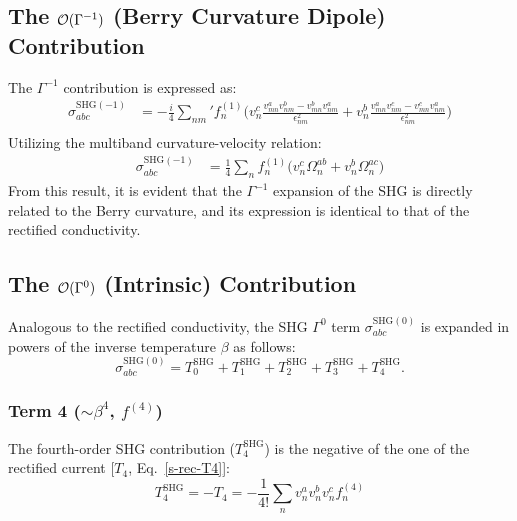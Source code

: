 \documentclass[twocolumn, prx, reprint, amsfonts, amsmath, amssymb, longbibliography, floatfix, aps]{revtex4-2}
\begin{document}
\subsection{The \texorpdfstring{${\cal O}(\Gamma^{-1})$}{O(Gamma-1)} (Berry Curvature Dipole) Contribution}
The $\Gamma^{-1}$ contribution is expressed as:
\begin{equation}
	\begin{aligned}
		\sigma^{\text{SHG}(-1)}_{abc} &= -\frac{i}{4} {\textstyle \sum_{nm}'} f^{(1)}_n \Big(v^c_{n}\frac{v^{a}_{mn}v^b_{nm} - v^{b}_{mn}v^a_{nm}}{\epsilon_{nm}^2} + v^b_{n}\frac{v^{a}_{mn}v^c_{nm} - v^{c}_{mn}v^a_{nm}}{\epsilon_{nm}^2} \Big) \\
	\end{aligned}
\end{equation}
Utilizing the multiband curvature-velocity relation:
\begin{equation}
	\begin{aligned}
		\sigma^{\text{SHG}(-1)}_{abc}
		&= \frac{1}{4} {\textstyle \sum_{n}} f^{(1)}_n \Big(v^c_{n}\Omega^{ab}_n + v^b_{n}\Omega^{ac}_n \Big)
	\end{aligned}
\end{equation}
From this result, it is evident that the $\Gamma^{-1}$ expansion of the SHG is directly related to the Berry curvature, and its expression is identical to that of the rectified conductivity.

\subsection{The \texorpdfstring{${\cal O}(\Gamma^{0})$}{O(Gamma-0)} (Intrinsic) Contribution}
Analogous to the rectified conductivity, the SHG $\Gamma^0$ term $\sigma_{abc}^{\text{SHG}(0)}$ is expanded in powers of the inverse temperature $\beta$ as follows:
\begin{equation}
	\sigma_{abc}^{\text{SHG}(0)} = T^{\text{SHG}}_0 + T^{\text{SHG}}_1 + T^{\text{SHG}}_2 + T^{\text{SHG}}_3 + T^{\text{SHG}}_4.
\end{equation}

\subsubsection*{Term 4 (\texorpdfstring{$\sim \beta^4$}{~beta4}, \texorpdfstring{$f^{(4)}$}{f4})}
The fourth-order SHG contribution ($T^{\text{SHG}}_4$) is the negative of the one of the rectified current [$T_4$, Eq.~\eqref{s-rec-T4}]:
\begin{equation}
	T^{\text{SHG}}_4 = -T_4 = -\frac{1}{4!} {\textstyle \sum_{n}} v^a_{n} v^{b}_{n}v^c_{n} f^{(4)}_n
\end{equation}
\end{document}
